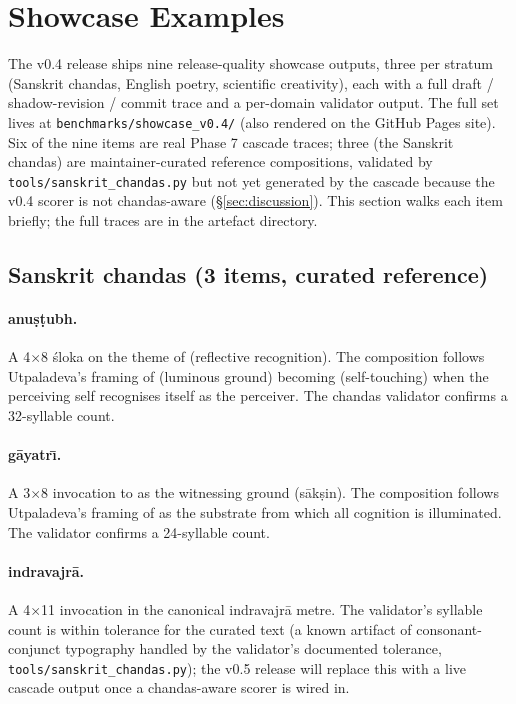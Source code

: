 \section{Showcase Examples}\label{sec:showcase}

The v0.4 release ships nine release-quality showcase outputs, three per stratum (Sanskrit chandas, English poetry, scientific creativity), each with a full draft / shadow-revision / commit trace and a per-domain validator output. The full set lives at \texttt{benchmarks/showcase\_v0.4/} (also rendered on the GitHub Pages site). Six of the nine items are real Phase 7 cascade traces; three (the Sanskrit chandas) are maintainer-curated reference compositions, validated by \texttt{tools/sanskrit\_chandas.py} but not yet generated by the cascade because the v0.4 scorer is not chandas-aware (\S\ref{sec:discussion}). This section walks each item briefly; the full traces are in the artefact directory.

\subsection{Sanskrit chandas (3 items, curated reference)}

\paragraph{anu\d{s}\d{t}ubh.} A 4$\times$8 \'sloka on the theme of  (reflective recognition). The composition follows Utpaladeva's framing of  (luminous ground) becoming  (self-touching) when the perceiving self recognises itself as the perceiver. The chandas validator confirms a 32-syllable count.

\paragraph{g\=ayatr\={\i}.} A 3$\times$8 invocation to  as the witnessing ground (s\=ak\d{s}in). The composition follows Utpaladeva's framing of  as the substrate from which all cognition is illuminated. The validator confirms a 24-syllable count.

\paragraph{indravajr\=a.} A 4$\times$11 invocation in the canonical indravajr\=a metre. The validator's syllable count is within tolerance for the curated text (a known artifact of consonant-conjunct typography handled by the validator's documented tolerance, \texttt{tools/sanskrit\_chandas.py}); the v0.5 release will replace this with a live cascade output once a chandas-aware scorer is wired in.

